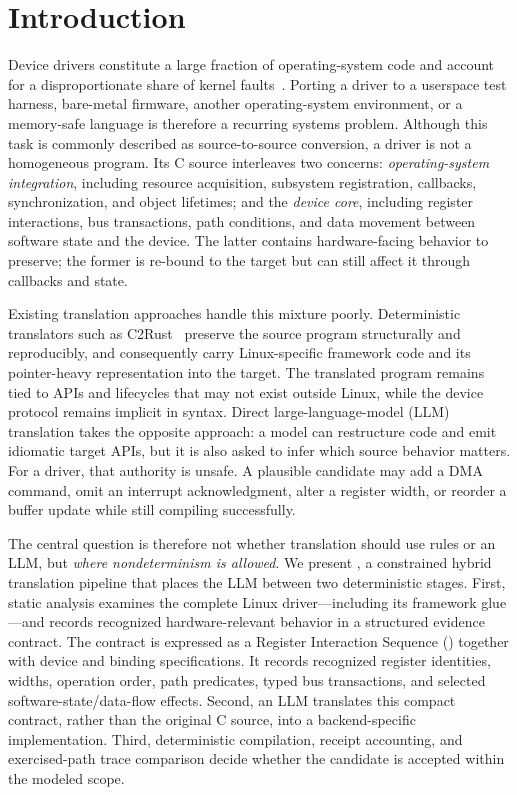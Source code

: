 
\section{Introduction}
\label{sec:introduction}

Device drivers constitute a large fraction of operating-system code and account for a disproportionate share of kernel faults~\cite{chou2001empirical,swift2005nexus}. Porting a driver to a userspace test harness, bare-metal firmware, another operating-system environment, or a memory-safe language is therefore a recurring systems problem. Although this task is commonly described as source-to-source conversion, a driver is not a homogeneous program. Its C source interleaves two concerns: \emph{operating-system integration}, including resource acquisition, subsystem registration, callbacks, synchronization, and object lifetimes; and the \emph{device core}, including register interactions, bus transactions, path conditions, and data movement between software state and the device. The latter contains hardware-facing behavior to preserve; the former is re-bound to the target but can still affect it through callbacks and state.

Existing translation approaches handle this mixture poorly. Deterministic translators such as C2Rust~\cite{emrath2021c2rust} preserve the source program structurally and reproducibly, and consequently carry Linux-specific framework code and its pointer-heavy representation into the target. The translated program remains tied to APIs and lifecycles that may not exist outside Linux, while the device protocol remains implicit in syntax. Direct large-language-model (LLM) translation takes the opposite approach: a model can restructure code and emit idiomatic target APIs, but it is also asked to infer which source behavior matters. For a driver, that authority is unsafe. A plausible candidate may add a DMA command, omit an interrupt acknowledgment, alter a register width, or reorder a buffer update while still compiling successfully.

The central question is therefore not whether translation should use rules or an LLM, but \emph{where nondeterminism is allowed}. We present \reharness{}, a constrained hybrid translation pipeline that places the LLM between two deterministic stages. First, static analysis examines the complete Linux driver---including its framework glue---and records recognized hardware-relevant behavior in a structured evidence contract. The contract is expressed as a Register Interaction Sequence (\rislang) together with device and binding specifications. It records recognized register identities, widths, operation order, path predicates, typed bus transactions, and selected software-state/data-flow effects. Second, an LLM translates this compact contract, rather than the original C source, into a backend-specific implementation. Third, deterministic compilation, receipt accounting, and exercised-path trace comparison decide whether the candidate is accepted within the modeled scope.

